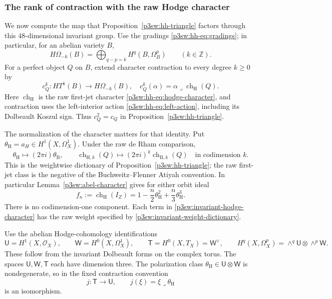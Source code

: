 \documentclass[11pt]{article}
\numberwithin{equation}{section}
\begin{document}
\subsubsection{The rank of contraction with the raw Hodge character}

We now compute the map that Proposition~\ref{p3sw:hh-triangle} factors
through this \(48\)-dimensional invariant group.  Use the gradings
\eqref{p3sw:hh-eq:gradings}; in particular, for an abelian variety \(B\),
\[
 H\Omega_{-k}(B)=\bigoplus_{q-p=k}H^q(B,\Omega_B^p)
 \qquad(k\in\mathbb Z).
\]
For a perfect object \(Q\) on \(B\), extend character contraction to every
degree \(k\geq0\) by
\[
 c_Q^k:HT^k(B)\longrightarrow H\Omega_{-k}(B),\quad
 c_Q^k(\alpha)=\alpha\mathbin{\lrcorner}
                    \operatorname{ch}_{\mathrm H}(Q).
\]
Here \(\operatorname{ch}_{\mathrm H}\) is the raw first-jet character
\eqref{p3sw:hh-eq:hodge-character}, and contraction uses the
left-interior action \eqref{p3sw:hh-eq:left-action}, including its
Dolbeault Koszul sign.  Thus \(c_Q^2=c_Q\) in
Proposition~\ref{p3sw:hh-triangle}.

The normalization of the character matters for that identity.  Put
\(\theta_{\mathrm H}=a_H\in H^1(X,\Omega_X^1)\).  Under the raw de
Rham comparison,
\begin{equation}\label{p3sw:invariant-weight-dictionary}
 \theta_{\mathrm H}\longmapsto(2\pi i)\theta_{\mathrm B},\qquad
 \operatorname{ch}_{\mathrm H,k}(Q)
   \longmapsto(2\pi i)^k\operatorname{ch}_{\mathrm B,k}(Q)
 \quad\text{in codimension }k.
\end{equation}
This is the weightwise dictionary of
Proposition~\ref{p3sw:hh-triangle}; the raw first-jet class is the
negative of the Buchweitz--Flenner Atiyah convention.  In particular
Lemma~\ref{p3sw:abel-character} gives for either orbit ideal
\begin{equation}\label{p3sw:invariant-hodge-character}
 f_n:=\operatorname{ch}_{\mathrm H}(I_Z)
 =1-\frac n2\theta_{\mathrm H}^2+\frac n3\theta_{\mathrm H}^3.
\end{equation}
There is no codimension-one component.  Each term in
\eqref{p3sw:invariant-hodge-character} has the raw weight specified by
\eqref{p3sw:invariant-weight-dictionary}.

Use the abelian Hodge-cohomology identifications
\[
 \mathsf U=H^1(X,\mathcal O_X),\qquad
 \mathsf W=H^0(X,\Omega_X^1),\qquad
 \mathsf T=H^0(X,T_X)=\mathsf W^\vee,
 \qquad
 H^q(X,\Omega_X^p)=\wedge^q\mathsf U\otimes\wedge^p\mathsf W.
\]
These follow from the invariant Dolbeault forms on the complex torus.
The spaces \(\mathsf U,\mathsf W,\mathsf T\) each have dimension three.  The
polarization class \(\theta_{\mathrm H}\in\mathsf U\otimes\mathsf W\)
is nondegenerate, so in the fixed contraction convention
\[
 j:\mathsf T\longrightarrow\mathsf U,\qquad
 j(\xi)=\xi\mathbin{\lrcorner}\theta_{\mathrm H}
\]
is an isomorphism.
\end{document}
